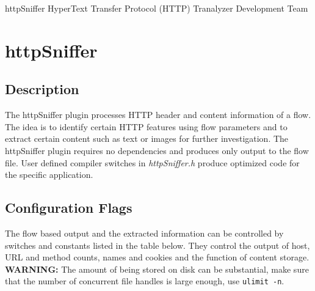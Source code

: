 \documentclass[documentation]{subfiles}
\begin{document}
\trantitle
    {httpSniffer}
    {HyperText Transfer Protocol (HTTP)}
    {Tranalyzer Development Team}

\section{httpSniffer}\label{s:httpSniffer}

\subsection{Description}
The httpSniffer plugin processes HTTP header and content information of a flow. The idea is to identify
certain HTTP features using flow parameters and to extract certain content such as text or
images for further investigation. The httpSniffer plugin requires no dependencies and produces
only output to the flow file. User defined compiler switches in {\em httpSniffer.h} produce
optimized code for the specific application.

\subsection{Configuration Flags}
The flow based output and the extracted information can be controlled by switches and constants listed in the table below.
They control the output of host, URL and method counts, names and cookies and the function of content storage.
{\bf WARNING:} The amount of being stored on disk can be substantial, make sure that the number of concurrent file handles
is large enough, use {\tt ulimit -n}.
\end{document}
